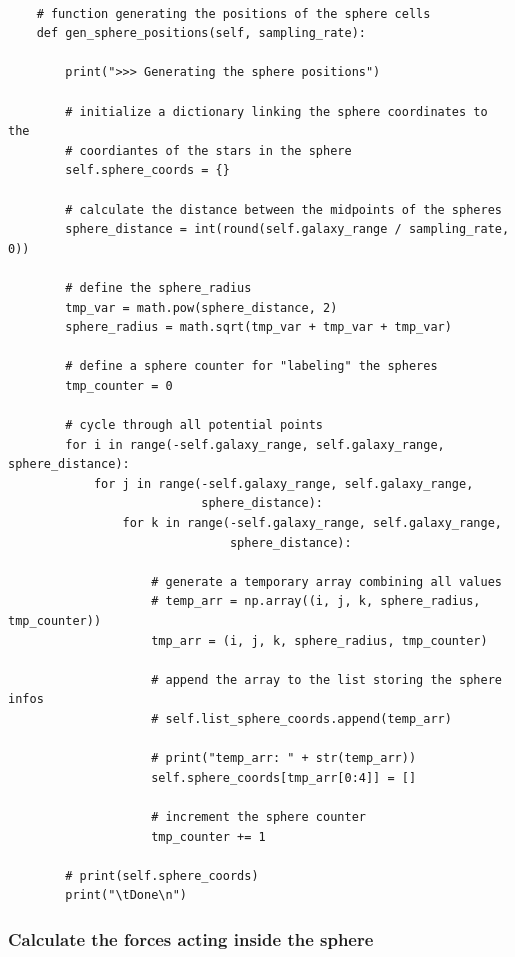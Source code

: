 \begin{lstlisting}

    # function generating the positions of the sphere cells
    def gen_sphere_positions(self, sampling_rate):

        print(">>> Generating the sphere positions")

        # initialize a dictionary linking the sphere coordinates to the
        # coordiantes of the stars in the sphere
        self.sphere_coords = {}

        # calculate the distance between the midpoints of the spheres
        sphere_distance = int(round(self.galaxy_range / sampling_rate, 0))

        # define the sphere_radius
        tmp_var = math.pow(sphere_distance, 2)
        sphere_radius = math.sqrt(tmp_var + tmp_var + tmp_var)

        # define a sphere counter for "labeling" the spheres
        tmp_counter = 0

        # cycle through all potential points
        for i in range(-self.galaxy_range, self.galaxy_range, sphere_distance):
            for j in range(-self.galaxy_range, self.galaxy_range,
                           sphere_distance):
                for k in range(-self.galaxy_range, self.galaxy_range,
                               sphere_distance):

                    # generate a temporary array combining all values
                    # temp_arr = np.array((i, j, k, sphere_radius, tmp_counter))
                    tmp_arr = (i, j, k, sphere_radius, tmp_counter)

                    # append the array to the list storing the sphere infos
                    # self.list_sphere_coords.append(temp_arr)

                    # print("temp_arr: " + str(temp_arr))
                    self.sphere_coords[tmp_arr[0:4]] = []

                    # increment the sphere counter
                    tmp_counter += 1

        # print(self.sphere_coords)
        print("\tDone\n")

\end{lstlisting}

\subsubsection{Calculate the forces acting inside the sphere}

